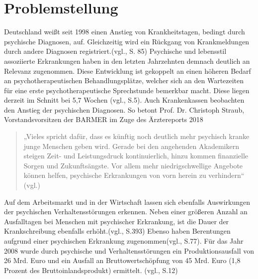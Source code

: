 
\section{Problemstellung}
\label{ch:Problemstellung}


Deutschland weißt seit 1998 einen Anstieg von Krankheitstagen, bedingt durch psychische Diagnosen, auf. Gleichzeitig wird ein Rückgang von Krankmeldungen durch andere Diagnosen registriert.(vgl.\cite{Jacobi2014}, S. 85) Psychische und lebensstil assoziierte Erkrankungen haben in den letzten Jahrzehnten demnach deutlich an Relevanz zugenommen. Diese Entwicklung ist gekoppelt an einen höheren Bedarf an psychotherapeutischen Behandlungsplätze, welcher sich an den Wartezeiten für eine erste psychotherapeutische Sprechstunde bemerkbar macht. Diese liegen derzeit im Schnitt bei 5,7 Wochen (vgl.\cite{Microsof77:online}, S.5). Auch Krankenkassen beobachten den Anstieg der psychischen Diagnosen. So betont Prof. Dr. Christoph Straub, Vorstandsvorsitzen der BARMER im Zuge des Ärztereports 2018 
\begin{quote}
„Vieles spricht dafür, dass es künftig noch deutlich mehr psychisch kranke junge Menschen geben wird. Gerade bei den angehenden Akademikern steigen Zeit- und Leistungsdruck kontinuierlich, hinzu kommen finanzielle Sorgen und Zukunftsängste. Vor allem mehr niedrigschwellige Angebote können helfen, psychische Erkrankungen von vorn herein zu verhindern“ (vgl.\cite{Arztrepo90:online})
\end{quote}
Auf dem Arbeitsmarkt und in der Wirtschaft lassen sich ebenfalls Auswirkungen der psychischen Verhaltensstörungen erkennen. Neben einer größeren Anzahl an Ausfalltagen bei Menschen mit psychischer Erkrankung, ist die Dauer der Krankschreibung ebenfalls erhöht.(vgl.\cite{Nubling2014}, S.393) Ebenso haben Berentungen aufgrund einer psychischen Erkrankung zugenommen(vgl.\cite{Jacobi2014}\cite{Nubling2014}, S.77). Für das Jahr 2008 wurde durch psychische und Verhaltensstörungen ein Produktionsausfall von 26 Mrd. Euro und ein Ausfall an Bruttowertschöpfung von 45 Mrd. Euro (1,8 Prozent des Bruttoinlandsprodukt) ermittelt. (vgl.\cite{EntwurfeinesDreizehntenGesetzeszurAnderungdesAtomgesetzesBundesregierungDeutschland2012}, S.12)

